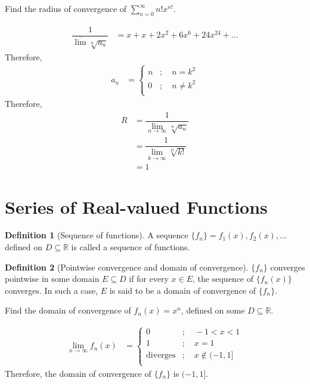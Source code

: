 \documentclass[fleqn, a4paper, 8pt, twoside]{amsart}
\theoremstyle{definition}
\theoremstyle{bluedefinition}
\newtheorem{definition}{Definition}
\theoremstyle{redtheorem}
\begin{document}
\begin{multicols}{2}
\begin{spacing}{0.7}
\begin{question}
	Find the radius of convergence of $\sum\limits_{n = 0}^{\infty} n! x^{n!}$.
\end{question}

\begin{solution}
	\begin{align*}
		\dfrac{1}{\overline{\lim}\sqrt[n]{a_n}} &= x + x + 2 x^2 + 6 x^6 + 24 x^{24} + \dots
	\end{align*}
	Therefore,
	\begin{align*}
		a_n &=
			\begin{cases}
				n &;\quad n = k^2\\
				0 &;\quad n \neq k^2\\
			\end{cases}
	\end{align*}
	Therefore, 
	\begin{align*}
		R &= \dfrac{1}{\lim\limits_{n \to \infty} \sqrt[n]{a_n}}\\
		&= \dfrac{1}{\lim\limits_{k \to \infty} \sqrt[k!]{k!}}\\
		&= 1
	\end{align*}
\end{solution}

\section{Series of Real-valued Functions}

\begin{definition}[Sequence of functions]
	A sequence $\{f_n\} = f_1(x), f_2(x), \dots$ defined on $D \subseteq \mathbb{R}$ is called a sequence of functions.
\end{definition}

\begin{definition}[Pointwise convergence and domain of convergence]
	$\{f_n\}$ converges pointwise in some domain $E \subseteq D$ if for every $x \in E$, the sequence of $\{f_n(x)\}$ converges.
	In such a case, $E$ is said to be a domain of convergence of $\{f_n\}$.
\end{definition}

\begin{question}
	Find the domain of convergence of $f_n(x) = x^n$, defined on some $D \subseteq \mathbb{R}$.
\end{question}

\begin{solution}
	\begin{align*}
		\lim\limits_{n \to \infty} f_n(x) &= 
			\begin{cases}
				0               & ;\quad -1 < x < 1      \\
				1               & ;\quad x = 1           \\
				\text{diverges} & ;\quad x \notin (-1,1] \\
			\end{cases}
	\end{align*}
	Therefore, the domain of convergence of $\{f_n\}$ is $(-1,1]$.
\end{solution}


\end{spacing}
\end{multicols}
\end{document}
